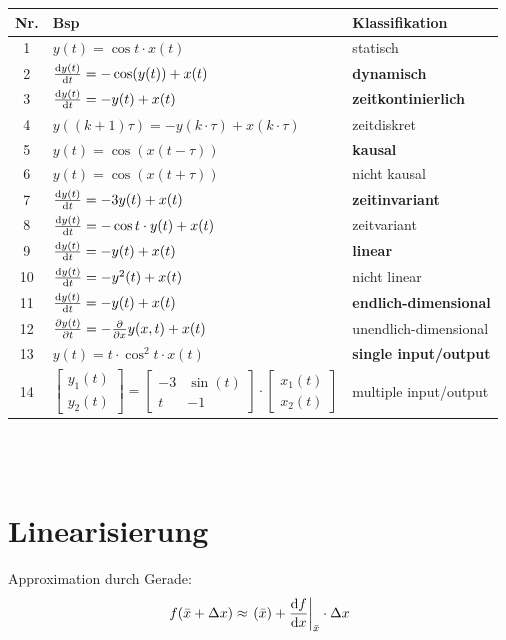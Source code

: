 \begin{tabular}{c|l|l}
 Nr. & Bsp & Klassifikation \\ 
\hline 1 & $y(t) = \cos t \cdot x(t)$ & statisch \\ 
	   2 & $\frac{\mathrm{d} y(t)}{\mathrm{d} t} = - \cos (y(t)) + x(t)$ & \textbf{dynamisch} \\ 
\hline 3 & $\frac{\mathrm{d} y(t)}{\mathrm{d} t} = -y(t) + x(t)$ & \textbf{zeitkontinierlich} \\ 
	   4 & $y((k+1)\tau)=-y(k\cdot \tau) + x(k \cdot \tau)$ & zeitdiskret \\ 
\hline 5 & $y(t) = \cos (x (t-\tau))$ & \textbf{kausal} \\ 
 	   6 & $y(t) = \cos(x(t+\tau))$ & nicht kausal \\ 
\hline 7 & $\frac{\mathrm{d} y(t)}{\mathrm{d} t} = -3y(t) + x(t)$ & \textbf{zeitinvariant} \\ 
	   8 & $\frac{\mathrm{d} y(t)}{\mathrm{d} t} = -\cos t \cdot y(t) +x(t)$ & zeitvariant \\ 
\hline 9 & $\frac{\mathrm{d} y(t)}{\mathrm{d} t} = -y(t) +x(t)$ & \textbf{linear} \\ 
	   10 & $\frac{\mathrm{d} y(t)}{\mathrm{d} t} = -y^2(t) +x(t)$ & nicht linear \\ 
\hline 11 & $\frac{\mathrm{d} y(t)}{\mathrm{d} t} = -y(t) +x(t)$ & \textbf{endlich-dimensional} \\ 
	   12 & $\frac{\partial y(t)}{\partial t} = - \frac{\partial }{\partial x}y(x,t)+x(t)$ & unendlich-dimensional \\ 
\hline 13 & $y(t) = t \cdot \cos^2 t \cdot x(t)$ & \textbf{single input/output} \\ 
	   14 & $\left[ \begin{matrix} y_1(t) \\ y_2(t) \end{matrix}\right] = \left[ \begin{matrix} -3 & \sin(t) \\ t & -1\end{matrix}\right] \cdot \left[ \begin{matrix} x_1(t)\\ x_2(t) \end{matrix}\right]$ & multiple input/output \\ 
\end{tabular} 
\\\\

\section{Linearisierung}
Approximation durch Gerade:
\[
	f(\bar{x}+\Delta x) \approx \left.(\bar{x})+\frac{\mathrm{d} f}{\mathrm{d} x}\right|_{\bar{x}}\cdot \Delta x
\]

